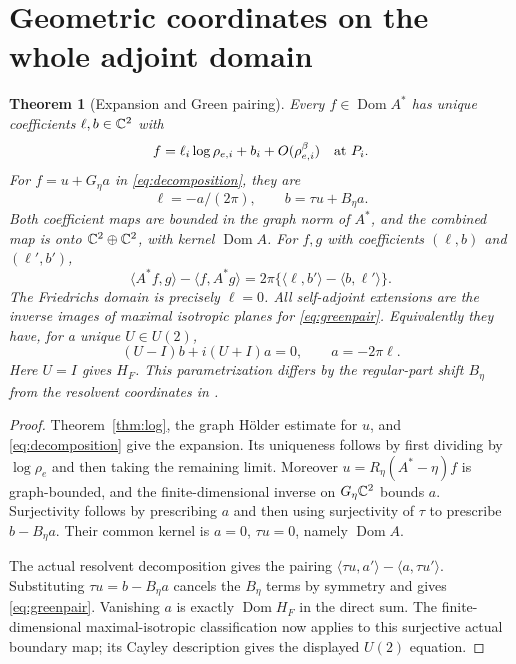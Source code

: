 \documentclass[11pt]{article}
\newtheorem{theorem}{Theorem}[section]
\theoremstyle{remark}\newtheorem{remark}[theorem]{Remark}
\newcommand{\Dom}{\operatorname{Dom}}\newcommand{\dd}{\,d}
\begin{document}
\section{Geometric coordinates on the whole adjoint domain}\label{sec:domains}
\begin{theorem}[Expansion and Green pairing]\label{thm:boundary}
Every $f\in\Dom A^*$ has unique coefficients $\ell,b\in\mathbb C^2$ with
\begin{equation}\label{eq:maxexp}
 f=\ell_i\log\rho_{e,i}+b_i+O(\rho_{e,i}^{\beta})\quad\hbox{at }P_i.
\end{equation}
For $f=u+G_\eta a$ in \eqref{eq:decomposition}, they are
\[
 \ell=-a/(2\pi),\qquad b=\tau u+B_\eta a.
\]
Both coefficient maps are bounded in the graph norm of $A^*$, and the combined
map is onto $\mathbb C^2\oplus\mathbb C^2$, with kernel $\Dom A$. For $f,g$ with
coefficients $(\ell,b)$ and $(\ell',b')$,
\begin{equation}\label{eq:greenpair}
 \langle A^*f,g\rangle-\langle f,A^*g\rangle
 =2\pi\{\langle\ell,b'\rangle-\langle b,\ell'\rangle\}.
\end{equation}
The Friedrichs domain is precisely $\ell=0$. All self-adjoint extensions are
the inverse images of maximal isotropic planes for \eqref{eq:greenpair}.
Equivalently they have, for a unique $U\in U(2)$,
\[
 (U-I)b+i(U+I)a=0,\qquad a=-2\pi\ell.
\]
Here $U=I$ gives $H_F$. This parametrization differs by the regular-part
shift $B_\eta$ from the resolvent coordinates in \cite{v02}.
\end{theorem}
\begin{proof}
Theorem~\ref{thm:log}, the graph H\"older estimate for $u$, and
\eqref{eq:decomposition} give the expansion. Its uniqueness follows by
first dividing by $\log\rho_e$ and then taking the remaining limit.
Moreover $u=R_\eta(A^*-\eta)f$ is graph-bounded, and the finite-dimensional
inverse on $G_\eta\mathbb C^2$ bounds $a$. Surjectivity follows by prescribing $a$
and then using surjectivity of $\tau$ to prescribe $b-B_\eta a$.
Their common kernel is $a=0$, $\tau u=0$, namely $\Dom A$.

The actual resolvent decomposition gives the pairing
$\langle\tau u,a'\rangle-\langle a,\tau u'\rangle$.
Substituting $\tau u=b-B_\eta a$ cancels the $B_\eta$ terms by symmetry
and gives \eqref{eq:greenpair}. Vanishing $a$ is exactly
$\Dom H_F$ in the direct sum. The finite-dimensional maximal-isotropic
classification now applies to this surjective actual boundary map; its Cayley
description gives the displayed $U(2)$ equation.
\end{proof}
\end{document}
